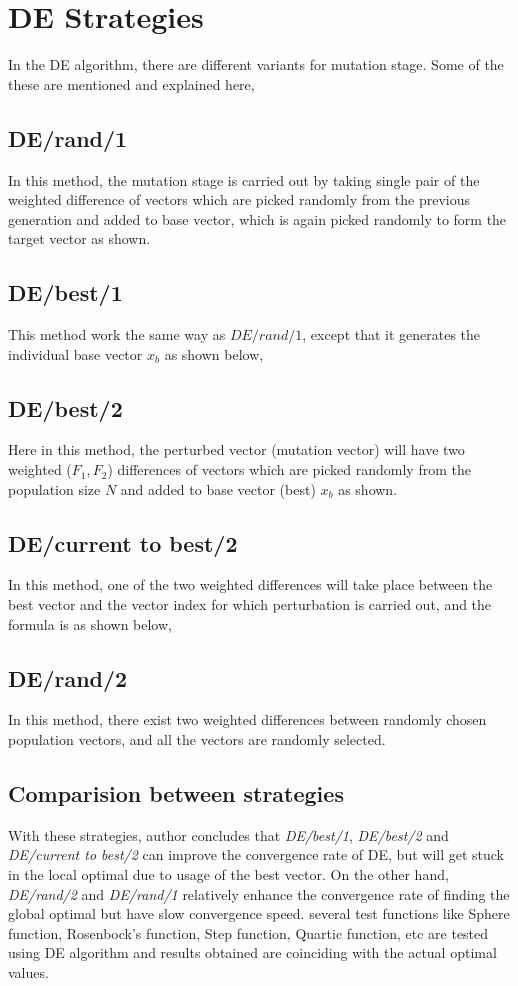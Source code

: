 \section{DE Strategies}
In the DE algorithm, there are different variants for mutation stage. Some of the these are mentioned and explained here,\cite{chi}

\subsection{DE/rand/1}
In this method, the mutation stage is carried out by taking single pair of the weighted difference of vectors which are picked randomly from the previous generation and added to base vector, which is again picked randomly to form the target vector as shown.

\subsection{DE/best/1}
This method work the same way as $DE/rand/1$, except that it generates the individual base vector $x_{b}$ as shown below,


\subsection{DE/best/2}
Here in this method, the perturbed vector  (mutation vector) will have two weighted ($F_1, F_2$) differences of vectors which are picked randomly from the population size \(N\) and added to base vector (best) \(x_b\) as shown.



\subsection{DE/current to best/2}
In this method, one of the two weighted differences will take place between the best vector and the vector index for which perturbation is carried out, and the formula is as shown below, 


\subsection{DE/rand/2}
In this method, there exist two weighted differences between randomly chosen population vectors, and all the vectors are randomly selected. 


\subsection{Comparision between strategies}
With these strategies, author\cite{chi} concludes that \textit{DE/best/1}, \textit{DE/best/2} and \textit{DE/current to best/2} can improve the convergence rate of DE, but will get stuck in the local optimal due to usage of the best vector. On the other hand, \textit{DE/rand/2} and \textit{DE/rand/1} relatively enhance the convergence rate of finding the global optimal but have slow convergence speed. several test functions like Sphere function, Rosenbock's function, Step function, Quartic function, etc are tested using DE algorithm and results obtained are coinciding with the actual optimal values.